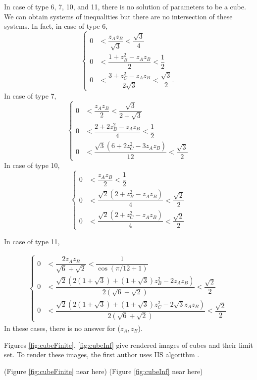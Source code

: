\documentclass[suppldata, dvipdfmx]{interact}
\theoremstyle{plain}%
\theoremstyle{definition}
\theoremstyle{remark}
\theoremstyle{problemstyle}
\begin{document}
In case of type 6, 7, 10, and 11, there is no solution of parameters to be a cube.  We can obtain systems of inequalities but there are no intersection of these systems.  In fact, in case of type 6,
 \[
\begin{cases}
 0 &< \dfrac{z_Az_B}{\sqrt{3}} < \dfrac{\sqrt{3}}{4} \\
 0 &< \dfrac{1 + z^2_B - z_Az_B}{2} < \dfrac{1}{2} \\
 0 &< \dfrac{3 + z^2_C - z_Az_B}{2\sqrt{3}} < \dfrac{\sqrt{3}}{2}.
\end{cases}
\]
In case of type 7,
 \[
\begin{cases}
0 &< \dfrac{z_Az_B}{2} < \dfrac{\sqrt{3}}{2 + \sqrt{3}} \\
0 &< \dfrac{2 + 2z^2_B - z_Az_B}{4} < \dfrac{1}{2} \\
0 &< \dfrac{\sqrt{3}(6 + 2z^2_C - 3z_Az_B)}{12} < \dfrac{\sqrt{3}}{2}
\end{cases}
\]
In case of type 10,
 \[
 \begin{cases}
  0 &< \dfrac{z_Az_B}{2} < \dfrac{1}{2}\\
  0 &< \dfrac{\sqrt{2}(2 + z^2_B - z_A z_B)}{4} < \dfrac{\sqrt{2}}{2}\\
  0 &< \dfrac{\sqrt{2}(2 + z^2_C - z_A z_B)}{4} < \dfrac{\sqrt{2}}{2}
 \end{cases}
\]

In case of type 11,

\begin{align*}
 \begin{cases}
  0 &< \dfrac{2z_Az_B}{\sqrt{6} + \sqrt{2}} < \dfrac{1}{\cos(\pi/12+1)}\\
  0 &< \dfrac{\sqrt{2}(2 (1 + \sqrt{3}) + (1 + \sqrt{3})z^2_B -2z_Az_B)}
  {2(\sqrt{6} + \sqrt{2})} < \dfrac{\sqrt{2}}{2}\\
  0 &< \dfrac{\sqrt{2}(2 (1 + \sqrt{3}) + (1 + \sqrt{3})z^2_C
  -2\sqrt{3}z_Az_B)}
  {2(\sqrt{6} + \sqrt{2})} < \dfrac{\sqrt{2}}{2}
 \end{cases}
\end{align*}
In these cases, there is no answer for ($z_A, z_B$).

Figures \ref{fig:cubeFinite}, \ref{fig:cubeInf} give rendered images of cubes and their limit set.  To render these images, the first author uses IIS algorithm \cite{bridges2018}.

\noindent(Figure \ref{fig:cubeFinite}
 near here)
(Figure \ref{fig:cubeInf}
 near here)
\end{document}
